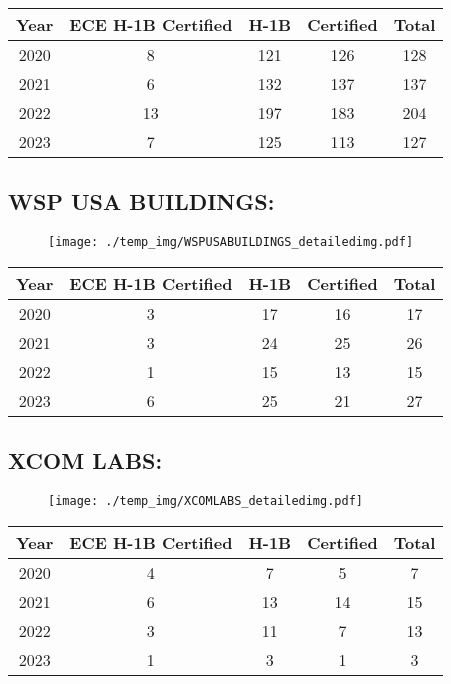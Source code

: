 \documentclass{article}%
\begin{document}
%
\begin{longtable}{c|c|c|c|c}%
\hline%
Year&ECE H{-}1B Certified&H{-}1B&Certified&Total\\%
\hline%
2020&8&121&126&128\\%
\hline%
2021&6&132&137&137\\%
\hline%
2022&13&197&183&204\\%
\hline%
2023&7&125&113&127\\%
\hline%
\end{longtable}

%
\newpage%
\subsection{WSP USA BUILDINGS:}%
\label{subsec:WSPUSABUILDINGS}%
\label{WSPUSABUILDINGSdetailed}%


\begin{figure}[htbp]%
\centering%
\texttt{[image: ./temp\_img/WSPUSABUILDINGS\_detailedimg.pdf]}%
\end{figure}

%
\begin{longtable}{c|c|c|c|c}%
\hline%
Year&ECE H{-}1B Certified&H{-}1B&Certified&Total\\%
\hline%
2020&3&17&16&17\\%
\hline%
2021&3&24&25&26\\%
\hline%
2022&1&15&13&15\\%
\hline%
2023&6&25&21&27\\%
\hline%
\end{longtable}

%
\newpage%
\subsection{XCOM LABS:}%
\label{subsec:XCOMLABS}%
\label{XCOMLABSdetailed}%


\begin{figure}[htbp]%
\centering%
\texttt{[image: ./temp\_img/XCOMLABS\_detailedimg.pdf]}%
\end{figure}

%
\begin{longtable}{c|c|c|c|c}%
\hline%
Year&ECE H{-}1B Certified&H{-}1B&Certified&Total\\%
\hline%
2020&4&7&5&7\\%
\hline%
2021&6&13&14&15\\%
\hline%
2022&3&11&7&13\\%
\hline%
2023&1&3&1&3\\%
\hline%
\end{longtable}
\end{document}
